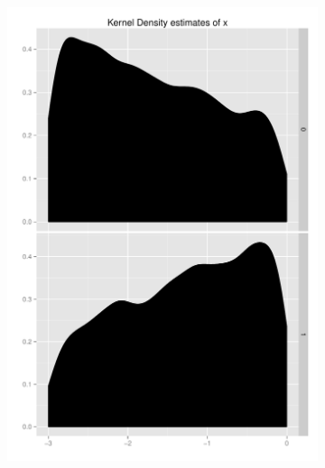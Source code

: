 \documentclass[11pt,letterpaper]{article}
\begin{document}
\begin{figure}[h]
	\centering
	\begin{subfigure}[b]{0.3\textwidth}\centering \includegraphics[width=1\textwidth]{x}  \end{subfigure}

\end{figure}
\end{document}
